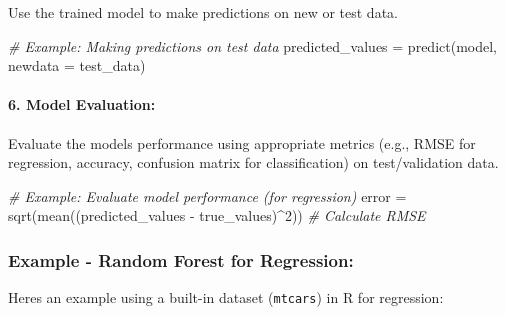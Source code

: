 \documentclass[
]{article}
\newenvironment{Shaded}{}{}
\newcommand{\AttributeTok}[1]{\textcolor[rgb]{0.49,0.56,0.16}{#1}}
\newcommand{\CommentTok}[1]{\textcolor[rgb]{0.38,0.63,0.69}{\textit{#1}}}
\newcommand{\DecValTok}[1]{\textcolor[rgb]{0.25,0.63,0.44}{#1}}
\newcommand{\FunctionTok}[1]{\textcolor[rgb]{0.02,0.16,0.49}{#1}}
\newcommand{\NormalTok}[1]{#1}
\newcommand{\OtherTok}[1]{\textcolor[rgb]{0.00,0.44,0.13}{#1}}
\newcommand{\SpecialCharTok}[1]{\textcolor[rgb]{0.25,0.44,0.63}{#1}}
\begin{document}
Use the trained model to make predictions on new or test data.

\begin{Shaded}
\begin{Highlighting}[]
\CommentTok{\# Example: Making predictions on test data}
\NormalTok{predicted\_values }\OtherTok{=} \FunctionTok{predict}\NormalTok{(model, }\AttributeTok{newdata =}\NormalTok{ test\_data)}
\end{Highlighting}
\end{Shaded}

\hypertarget{6-model-evaluation}{%
\paragraph{\texorpdfstring{6. \textbf{Model
Evaluation:}}{6. Model Evaluation:}}\label{6-model-evaluation}}

Evaluate the model\textquotesingle s performance using appropriate
metrics (e.g., RMSE for regression, accuracy, confusion matrix for
classification) on test/validation data.

\begin{Shaded}
\begin{Highlighting}[]
\CommentTok{\# Example: Evaluate model performance (for regression)}
\NormalTok{error }\OtherTok{=} \FunctionTok{sqrt}\NormalTok{(}\FunctionTok{mean}\NormalTok{((predicted\_values }\SpecialCharTok{{-}}\NormalTok{ true\_values)}\SpecialCharTok{\^{}}\DecValTok{2}\NormalTok{))  }\CommentTok{\# Calculate RMSE}
\end{Highlighting}
\end{Shaded}

\hypertarget{example---random-forest-for-regression}{%
\subsubsection{Example - Random Forest for
Regression:}\label{example---random-forest-for-regression}}

Here\textquotesingle s an example using a built-in dataset
(\texttt{mtcars}) in R for regression:
\end{document}

